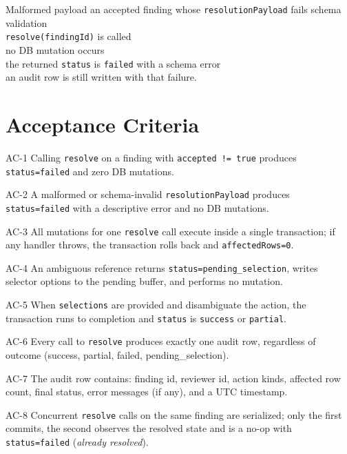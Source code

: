 \begin{scenario}{Malformed payload}
\Given an accepted finding whose \texttt{resolutionPayload} fails schema validation \\
\When \texttt{resolve(findingId)} is called \\
\Then no DB mutation occurs \\
\And the returned \texttt{status} is \texttt{failed} with a schema error \\
\And an audit row is still written with that failure.
\end{scenario}

\section{Acceptance Criteria}

\begin{ac}{AC-1}
Calling \texttt{resolve} on a finding with \texttt{accepted != true} produces \texttt{status=failed} and zero DB mutations.
\end{ac}
\begin{ac}{AC-2}
A malformed or schema-invalid \texttt{resolutionPayload} produces \texttt{status=failed} with a descriptive error and no DB mutations.
\end{ac}
\begin{ac}{AC-3}
All mutations for one \texttt{resolve} call execute inside a single transaction; if any handler throws, the transaction rolls back and \texttt{affectedRows=0}.
\end{ac}
\begin{ac}{AC-4}
An ambiguous reference returns \texttt{status=pending\_selection}, writes selector options to the pending buffer, and performs no mutation.
\end{ac}
\begin{ac}{AC-5}
When \texttt{selections} are provided and disambiguate the action, the transaction runs to completion and \texttt{status} is \texttt{success} or \texttt{partial}.
\end{ac}
\begin{ac}{AC-6}
Every call to \texttt{resolve} produces exactly one audit row, regardless of outcome (success, partial, failed, pending\_selection).
\end{ac}
\begin{ac}{AC-7}
The audit row contains: finding id, reviewer id, action kinds, affected row count, final status, error messages (if any), and a UTC timestamp.
\end{ac}
\begin{ac}{AC-8}
Concurrent \texttt{resolve} calls on the same finding are serialized; only the first commits, the second observes the resolved state and is a no-op with \texttt{status=failed} (\emph{already resolved}).
\end{ac}

